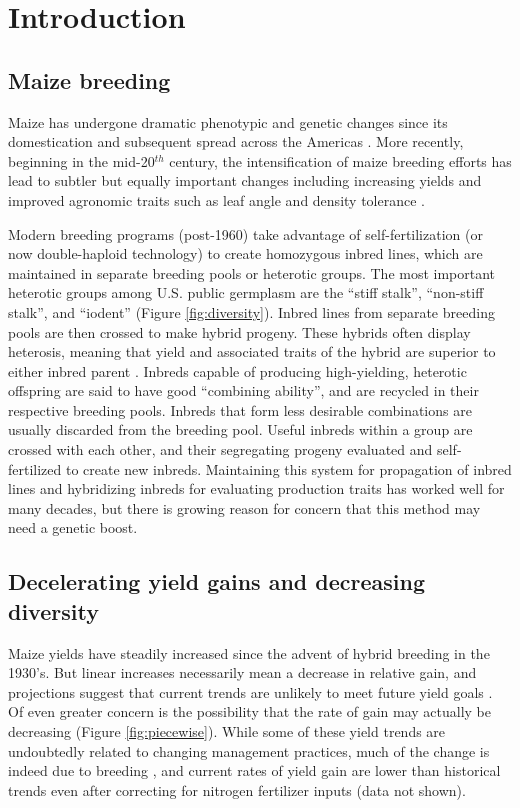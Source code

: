 \documentclass[12pt]{article}
\begin{document}
\section*{Introduction}
\label{sec:introduction}

\subsection*{Maize breeding}
Maize has undergone dramatic phenotypic and genetic changes since its domestication and subsequent spread across the Americas \citep{daFonseca:2015ey,Doebley:2004ce}. More recently, beginning in the mid-20$^{th}$ century, the intensification of maize breeding efforts has lead to subtler but equally important changes including increasing yields and improved agronomic traits such as leaf angle and density tolerance \citep{duvick2005contribution}. 

Modern breeding programs (post-1960) take advantage of self-fertilization (or now double-haploid technology) to create homozygous inbred lines, which are maintained in separate breeding pools or heterotic groups.
The most important heterotic groups among U.S. public germplasm are the ``stiff stalk'', ``non-stiff stalk'', and ``iodent'' (Figure \ref{fig:diversity}).
Inbred lines from separate breeding pools are then crossed to make hybrid progeny.  
These hybrids often display heterosis, meaning that yield and associated traits of the hybrid are superior to  either inbred parent \citep{Springer:2007bj}.  
Inbreds capable of producing high-yielding, heterotic offspring are said to have good ``combining ability'', and are recycled in their respective breeding pools.
Inbreds that form less desirable combinations are usually discarded from the breeding pool. 
Useful inbreds within a group are crossed with each other, and their segregating progeny evaluated and self-fertilized to create new inbreds. 
Maintaining this system for propagation of inbred lines and hybridizing inbreds for evaluating production traits has worked well for many decades, but there is growing reason for concern that this method may need a genetic boost. 

\subsection*{Decelerating yield gains and decreasing diversity} 

Maize yields have steadily increased since the advent of hybrid breeding in the 1930's.
But linear increases necessarily mean a decrease in relative gain, and projections suggest that current trends are unlikely to meet future yield goals \citep{grassini2013distinguishing}. 
Of even greater concern is the possibility that the rate of gain may actually be decreasing (Figure \ref{fig:piecewise}).
While some of these yield trends are undoubtedly related to changing management practices, much of the change is indeed due to breeding \citep{Duvick:2001fy}, and current rates of yield gain are lower than historical trends even after correcting for nitrogen fertilizer inputs (data not shown). 
\end{document}
